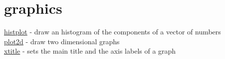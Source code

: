    \chapter*{graphics}

\hyperlink{histplot}{histplot} - draw an histogram of the components of a vector of numbers\\
\hyperlink{plot2d}{plot2d} - draw two dimensional graphs\\
\hyperlink{xtitle}{xtitle} - sets the main title and the axis labels
of a graph\\

   
   
   
